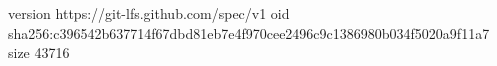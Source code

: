 version https://git-lfs.github.com/spec/v1
oid sha256:c396542b637714f67dbd81eb7e4f970cee2496c9c1386980b034f5020a9f11a7
size 43716
